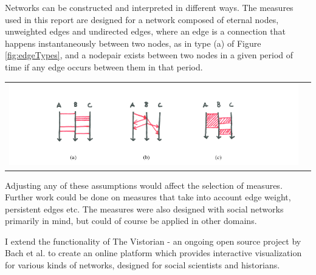 Networks can be constructed and interpreted in different ways. The measures used in this report are designed for a network composed of eternal nodes, unweighted edges and undirected edges, where an edge is a connection that happens instantaneously between two nodes, as in type (a) of Figure \ref{fig:edgeTypes}, and a nodepair exists between two nodes in a given period of time if any edge occurs between them in that period. 

\begin{center}
\begin{tabular}{cc}
\includegraphics[trim={0 0 0 0}, width=140mm]{./Figures/edgeTypes.png}
\end{tabular}
\label{fig:edgeTypes}
\end{center}

Adjusting any of these assumptions would affect the selection of measures. Further work could be done on measures that take into account edge weight, persistent edges etc. The measures were also designed with social networks primarily in mind, but could of course be applied in other domains.

I extend the functionality of The Vistorian \cite{bach:hal-01205822} - an ongoing open source project by Bach et al. to create an online platform which provides interactive visualization for various kinds of networks, designed for social scientists and historians. 




